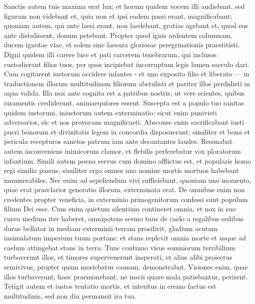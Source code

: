 \begin{biblechapter}  
\verse Sanctis autem tuis maxima erat lux; et horum quidem vocem illi audiebant, sed figuram non videbant et, quia non et ipsi eadem passi erant, magnificabant; 
\verse quoniam autem, qui ante laesi erant, non laedebant, gratias agebant et, quod eos ante distulissent, donum petebant. 
\verse Propter quod ignis ardentem columnam, ducem ignotae viae, et solem sine laesura gloriosae peregrinationis praestitisti. 
\verse Digni quidem illi carere luce et pati carcerem tenebrarum, qui inclusos custodierant filios tuos, per quos incipiebat incorruptum legis lumen saeculo dari. 
\verse Cum cogitarent iustorum occidere infantes - et uno exposito filio et liberato — in traductionem illorum multitudinem filiorum abstulisti et pariter illos perdidisti in aqua valida. 
\verse Illa nox ante cognita est a patribus nostris, ut vere scientes, quibus iuramentis crediderunt, animaequiores essent. 
\verse Suscepta est a populo tuo sanitas quidem iustorum, iniustorum autem exterminatio; 
\verse sicut enim punivisti adversarios, sic et nos provocans magnificasti. 
\verse Absconse enim sacrificabant iusti pueri bonorum et divinitatis legem in concordia disposuerunt; similiter et bona et pericula recepturos sanctos patrum iam ante decantantes laudes. 
\verse Resonabat autem inconveniens inimicorum clamor, et flebilis perferebatur vox ploratorum infantium. 
\verse Simili autem poena servus cum domino afflictus est, et popularis homo regi similia passus; 
\verse similiter ergo omnes uno nomine mortis mortuos habebant innumerabiles. Nec enim ad sepeliendum vivi sufficiebant, quoniam uno momento, quae erat praeclarior generatio illorum, exterminata erat. 
\verse De omnibus enim non credentes propter veneficia, in exterminio primogenitorum confessi sunt populum filium Dei esse. 
\verse Cum enim quietum silentium contineret omnia, et nox in suo cursu medium iter haberet, 
\verse omnipotens sermo tuus de caelo a regalibus sedibus durus bellator in mediam exterminii terram prosilivit, gladium acutum insimulatum imperium tuum portans; 
\verse et stans replevit omnia morte et usque ad caelum attingebat stans in terra. 
\verse Tunc continuo visus somniorum terribilium turbaverunt illos, et timores supervenerunt insperati, 
\verse et alius alibi proiectus semivivus, propter quam moriebatur causam, demonstrabat. 
\verse Visiones enim, quae illos turbaverunt, haec praemonebant, ne inscii quare mala patiebantur, perirent. 
\verse Tetigit autem et iustos tentatio mortis, et interitus in eremo factus est multitudinis, sed non diu permansit ira tua. 

\end{biblechapter}
